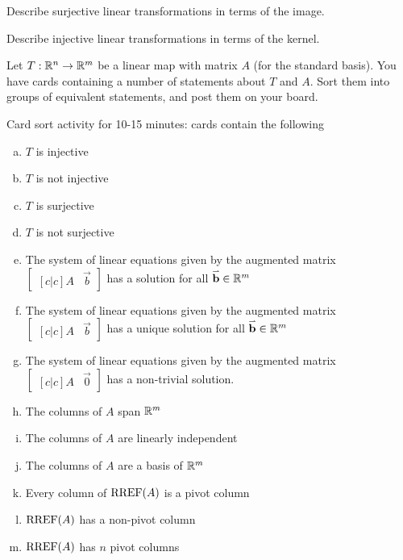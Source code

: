 
\begin{applicationActivities}{3}{19}
\begin{activity}{15}
  \begin{subactivity}
    Describe surjective linear transformations in terms of the image.
  \end{subactivity}
  \begin{subactivity}
    Describe injective linear transformations in terms of the kernel.
  \end{subactivity}
\end{activity}

\begin{activity}{15}
Let $T: \mathbb{R}^n \rightarrow \mathbb{R}^m$ be a linear map with matrix $A$ (for the standard basis).  You have cards containing a number of statements about $T$ and $A$.  Sort them into groups of equivalent statements, and post them on your board.

\begin{TBLnote}Card sort activity for 10-15 minutes: cards contain the following
\begin{enumerate}[(a)]
\item $T$ is injective
\item $T$ is not injective
\item $T$ is surjective
\item $T$ is not surjective
\item The system of linear equations given by the augmented matrix $\begin{bmatrix}[c|c]A & \vec{b} \end{bmatrix}$ has a solution for all $\mathbf{\accentset{\rightharpoonup}{b}} \in \mathbb{R}^m$
\item The system of linear equations given by the augmented matrix $\begin{bmatrix}[c|c]A & \vec{b} \end{bmatrix}$ has a unique solution for all $\mathbf{\accentset{\rightharpoonup}{b}} \in \mathbb{R}^m$
\item The system of linear equations given by the augmented matrix $\begin{bmatrix}[c|c] A & \vec{0} \end{bmatrix}$ has a non-trivial solution.
\item The columns of $A$ span $\mathbb{R}^m$
\item The columns of $A$ are linearly independent
\item The columns of $A$ are a basis of $\mathbb{R}^m$
\item Every column of $\operatorname{RREF}(A)$ is a pivot column
\item $\operatorname{RREF}(A)$ has a non-pivot column
\item $\operatorname{RREF}(A)$ has $n$ pivot columns
\end{enumerate}
\end{TBLnote}
\end{activity}


\end{applicationActivities}
